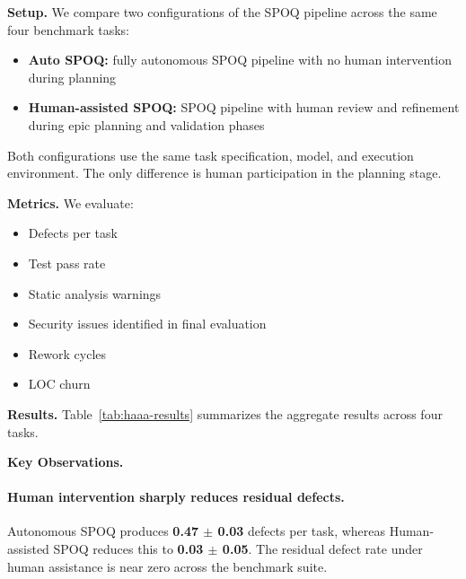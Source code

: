 \textbf{Setup.}
We compare two configurations of the SPOQ pipeline across the same four benchmark tasks:

\begin{itemize}
    \item \textbf{Auto SPOQ:} fully autonomous SPOQ pipeline with no human intervention during planning
    \item \textbf{Human-assisted SPOQ:} SPOQ pipeline with human review and refinement during epic planning and validation phases
\end{itemize}

Both configurations use the same task specification, model, and execution environment. The only difference is human participation in the planning stage.

\textbf{Metrics.}
We evaluate:

\begin{itemize}
    \item Defects per task
    \item Test pass rate
    \item Static analysis warnings
    \item Security issues identified in final evaluation
    \item Rework cycles
    \item LOC churn
\end{itemize}

\textbf{Results.}
Table~\ref{tab:haaa-results} summarizes the aggregate results across four tasks.

\begin{table}[t]
\centering
\caption{Experiment 4 results aggregated across four tasks (mean $\pm$ sd).}
\label{tab:haaa-results}
\end{table}

\textbf{Key Observations.}

\paragraph{Human intervention sharply reduces residual defects.}
Autonomous SPOQ produces \textbf{0.47 $\pm$ 0.03} defects per task, whereas Human-assisted SPOQ reduces this to \textbf{0.03 $\pm$ 0.05}. The residual defect rate under human assistance is near zero across the benchmark suite.

